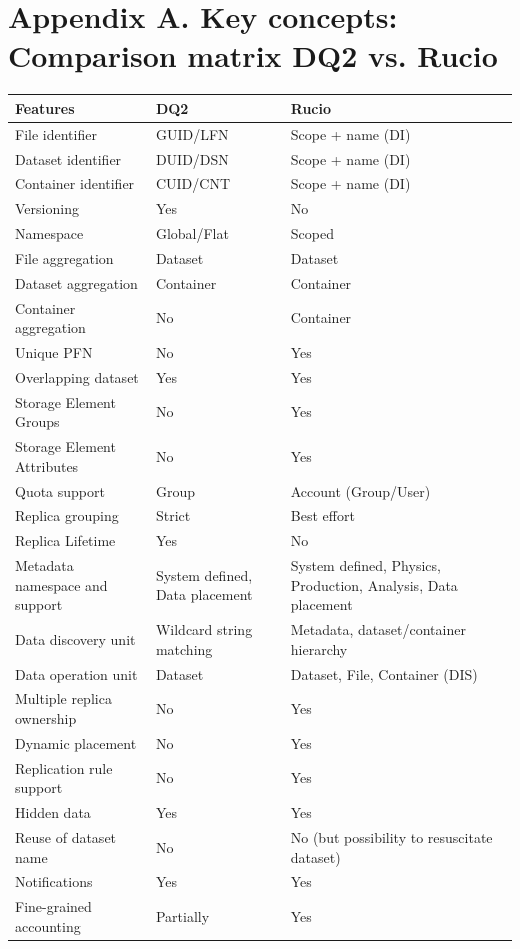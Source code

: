\documentclass{atlasnote}
\begin{document}
\section*{Appendix A. Key concepts: Comparison matrix DQ2 vs. Rucio}
\label{Comparison_matrix:key-concepts-comparison-matrix-dq2-vs-rucio}
\begin{tabular}{l l p{5cm} }
\toprule
\textbf{
Features
} & \textbf{
DQ2
} & \textbf{
Rucio
}\\
\midrule
File identifier & GUID/LFN & Scope + name (DI) \\
Dataset identifier & DUID/DSN & Scope + name (DI) \\
Container identifier & CUID/CNT & Scope + name (DI) \\
Versioning & Yes & No \\
Namespace & Global/Flat & Scoped  \\
File aggregation & Dataset & Dataset  \\
Dataset aggregation & Container & Container  \\
Container aggregation & No  & Container  \\
Unique PFN & No & Yes \\
Overlapping dataset & Yes & Yes \\
Storage Element Groups & No & Yes \\
Storage Element Attributes & No & Yes \\
Quota support & Group & Account (Group/User) \\
Replica grouping & Strict & Best effort \\
Replica Lifetime & Yes & No \\
Metadata namespace and support & System defined, Data placement & System defined, Physics, Production, Analysis, Data placement \\
Data discovery unit & Wildcard string matching & Metadata, dataset/container hierarchy\\
Data operation unit &Dataset & Dataset, File, Container (DIS) \\
Multiple replica ownership & No & Yes \\
Dynamic placement & No & Yes \\
Replication rule support & No & Yes \\
Hidden data & Yes & Yes \\
Reuse of dataset name & No & No (but possibility to resuscitate dataset) \\
Notifications & Yes & Yes \\
Fine-grained accounting & Partially & Yes \\
\bottomrule
\end{tabular}
\end{document}
